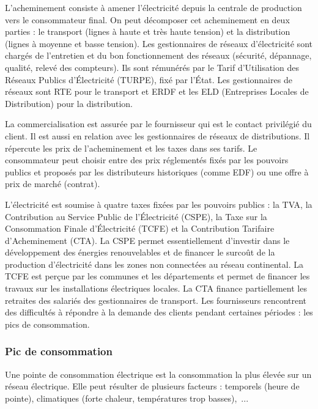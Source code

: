 L'acheminement consiste à amener l'électricité depuis la centrale de production vers le consommateur final. On peut décomposer cet acheminement en deux parties : le transport (lignes à haute et très haute tension) et la distribution (lignes à moyenne et basse tension). Les gestionnaires de réseaux d'électricité sont chargés de l'entretien et du bon fonctionnement des réseaux (sécurité, dépannage, qualité, relevé des compteurs). Ils sont rémunérés par le Tarif d'Utilisation des Réseaux Publics d'Électricité (TURPE), fixé par l'État. Les gestionnaires de réseaux sont RTE pour le transport et ERDF et les ELD (Entreprises Locales de Distribution) pour la distribution.

La commercialisation est assurée par le fournisseur qui est le contact privilégié du client. Il est aussi en relation avec les gestionnaires de réseaux de distributions. Il répercute les prix de l'acheminement et les taxes dans ses tarifs. Le consommateur peut choisir entre des prix réglementés fixés par les pouvoirs publics et proposés par les distributeurs historiques (comme EDF) ou une offre à prix de marché (contrat).

L'électricité est soumise à quatre taxes fixées par les pouvoirs publics : la TVA, la Contribution au Service Public de l'Électricité (CSPE), la Taxe sur la Consommation Finale d'Électricité (TCFE) et la Contribution Tarifaire d'Acheminement (CTA). La CSPE permet essentiellement d'investir dans le développement des énergies renouvelables et de financer le surcoût de la production d'électricité dans les zones non connectées au réseau continental. La TCFE est perçue par les communes et les départements et permet de financer les travaux sur les installations électriques locales. La CTA finance partiellement les retraites des salariés des gestionnaires de transport.
Les fournisseurs rencontrent des difficultés à répondre à la demande des clients pendant certaines périodes : les pics de consommation.


\subsubsection{Pic de consommation}
Une pointe de consommation électrique est la consommation la plus élevée sur un réseau électrique. Elle peut résulter de plusieurs facteurs : temporels (heure de pointe), climatiques (forte chaleur, températures trop basses),~...

